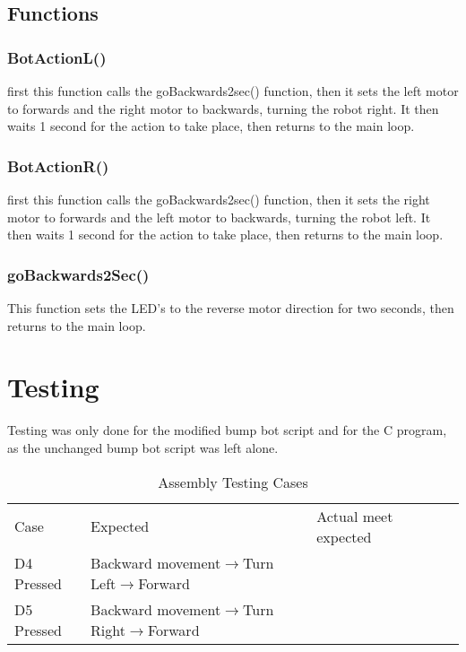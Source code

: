 \documentclass[12pt,letterpaper]{article}
\begin{document}
\subsection{Functions}
	\subsubsection{BotActionL()}
	first this function calls the goBackwards2sec() function, then it sets the left motor to forwards and the right motor to backwards, turning the robot right. It then waits 1 second for the action to take place, then returns to the main loop.
	
	\subsubsection{BotActionR()}
	first this function calls the goBackwards2sec() function, then it sets the right motor to forwards and the left motor to backwards, turning the robot left. It then waits 1 second for the action to take place, then returns to the main loop.

	\subsubsection{goBackwards2Sec()}
	This function sets the LED's to the reverse motor direction for two seconds, then returns to the main loop.

\section{Testing}
Testing was only done for the modified bump bot script and for the C program, as the unchanged bump bot script was left alone.
\begin{table}[h]
	\centering
	\begin{tabular}{|l|l|l|ll}
		\cline{1-3}
		Case & Expected & Actual meet expected &  &  \\ \cline{1-3}
	D4 Pressed	&Backward movement$\rightarrow$Turn Left$\rightarrow$Forward&	\checkmark  &  \\ \cline{1-3}
	D5 Pressed	&Backward movement$\rightarrow$Turn Right$\rightarrow$Forward&	\checkmark	&  \\ \cline{1-3}
	\end{tabular}
\caption{Assembly Testing Cases}
\end{table}
\end{document}
